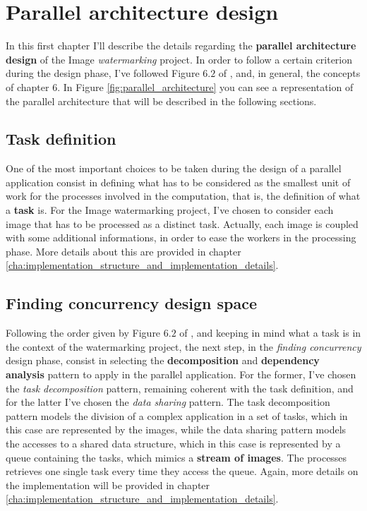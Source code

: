 \chapter{Parallel architecture design} %
\label{cha:parallel_architecture_design}
    In this first chapter I'll describe the details regarding the \textbf{parallel architecture design} of
    the Image \textit{watermarking} project. In order to follow a certain criterion during the design phase,
    I've followed Figure $6.2$ of \cite{DSPM}, and, in general, the
    concepts of chapter $6$. In Figure \ref{fig:parallel_architecture} you can see a representation of the
    parallel architecture that will be described in the following sections.

    \section{Task definition} %
    \label{sec:task_definition}
        One of the most important choices to be taken during the design of a parallel application consist in
        defining what has to be considered as the smallest unit of work for the processes involved in the
        computation, that is, the definition of what a \textbf{task} is. For the Image watermarking project,
        I've chosen to consider each image that has to be processed as a distinct task. Actually, each image is
        coupled with some additional informations, in order to ease the workers in the processing phase. More
        details about this are provided in chapter \ref{cha:implementation_structure_and_implementation_details}.

    \section{Finding concurrency design space} %
    \label{sec:finding_concurrency_design_space}
        Following the order given by Figure $6.2$ of \cite{DSPM}, and keeping in mind what a task is in the
        context of the watermarking project, the next step, in the \textit{finding concurrency} design phase,
        consist in selecting the \textbf{decomposition} and \textbf{dependency analysis} pattern to apply in the
        parallel application. For the former, I've chosen the \textit{task decomposition} pattern, remaining
        coherent with the task definition, and for the latter I've chosen the \textit{data sharing} pattern.
        The task decomposition pattern models the division of a complex application in a set of tasks, which in
        this case are represented by the images, while the data sharing pattern models the accesses to a shared
        data structure, which in this case is represented by a queue containing the tasks, which mimics a
        \textbf{stream of images}. The processes retrieves one single task every time they access the queue.
        Again, more details on the implementation will be provided in chapter
        \ref{cha:implementation_structure_and_implementation_details}.

